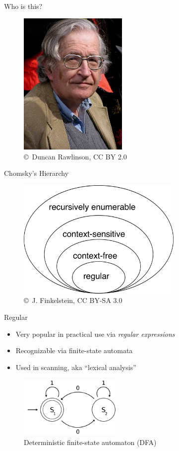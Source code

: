 \documentclass{beamer}
\begin{document}
\begin{frame}{Who is this?}
\centering
  \begin{figure}
    \includegraphics[height=70mm]{Chomsky.jpg}
    \caption{\small \copyright~Duncan Rawlinson, CC BY 2.0}
  \end{figure}
\end{frame}

\begin{frame}{Chomsky's Hierarchy}
  \begin{figure}
    \includegraphics[width=80mm]{Chomsky-hierarchy.pdf}
    \caption{\copyright~J. Finkelstein, CC BY-SA 3.0}
  \end{figure}
\end{frame}

\begin{frame}{Regular}
  \begin{itemize}
    \item Very popular in practical use via \textit{regular expressions}
    \item Recognizable via finite-state automata
    \item Used in scanning, aka ``lexical analysis''
  \end{itemize}
  \begin{figure}
    \includegraphics[height=30mm]{DFAexample.pdf}
    \caption{Deterministic finite-state automaton (DFA)}
  \end{figure}
\end{frame}
\end{document}
